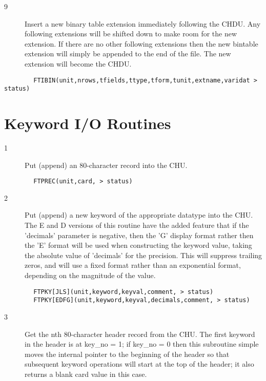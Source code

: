 \documentclass[11pt]{book}
\begin{document}
\begin{description}
\item[9 ] Insert a new binary table extension immediately following the CHDU.
    Any following extensions will be shifted down to make room for
    the new extension.  If there are no other following extensions
    then the new bintable extension will simply be appended to the
   end of the file.  The new extension will become the CHDU.
\end{description}

\begin{verbatim}
        FTIBIN(unit,nrows,tfields,ttype,tform,tunit,extname,varidat > status)
\end{verbatim}

\section{Keyword I/O Routines}


\begin{description}
\item[1 ]Put (append) an 80-character record into the CHU.
\end{description}

\begin{verbatim}
        FTPREC(unit,card, > status)
\end{verbatim}

\begin{description}
\item[2 ] Put (append) a new keyword of the appropriate datatype into the CHU.
     The E and D versions of this routine have the added feature that
     if the 'decimals' parameter is negative, then the 'G' display
     format rather then the 'E' format will be used when constructing
     the keyword value, taking the absolute value of 'decimals' for the
     precision.  This will suppress trailing zeros, and will use a
     fixed format rather than an exponential format,
    depending on the magnitude of the value.
\end{description}

\begin{verbatim}
        FTPKY[JLS](unit,keyword,keyval,comment, > status)
        FTPKY[EDFG](unit,keyword,keyval,decimals,comment, > status)
\end{verbatim}

\begin{description}
\item[3 ]Get the nth 80-character header record from the CHU.  The first keyword
   in the header is at key\_no = 1;  if key\_no = 0 then this subroutine
   simple moves the internal pointer to the beginning of the header
   so that subsequent keyword operations will start at the top of
  the header; it also returns a blank card value in this case.
\end{description}
\end{document}
